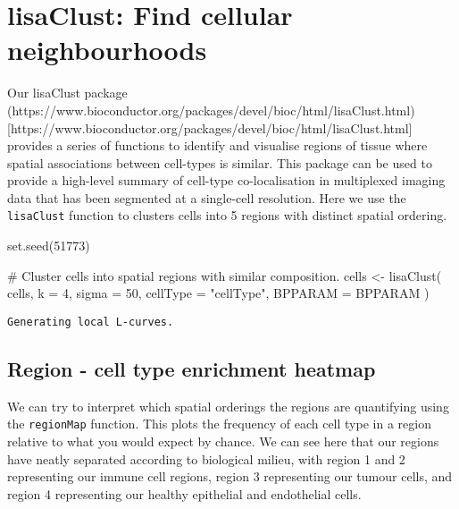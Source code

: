 \documentclass[
  letterpaper,
  DIV=11,
  numbers=noendperiod]{scrreprt}
\newenvironment{Shaded}{\begin{snugshade}}{\end{snugshade}}
\newcommand{\AttributeTok}[1]{\textcolor[rgb]{0.40,0.45,0.13}{#1}}
\newcommand{\CommentTok}[1]{\textcolor[rgb]{0.37,0.37,0.37}{#1}}
\newcommand{\DecValTok}[1]{\textcolor[rgb]{0.68,0.00,0.00}{#1}}
\newcommand{\FunctionTok}[1]{\textcolor[rgb]{0.28,0.35,0.67}{#1}}
\newcommand{\NormalTok}[1]{\textcolor[rgb]{0.00,0.23,0.31}{#1}}
\newcommand{\OtherTok}[1]{\textcolor[rgb]{0.00,0.23,0.31}{#1}}
\newcommand{\StringTok}[1]{\textcolor[rgb]{0.13,0.47,0.30}{#1}}
\begin{document}
\section{lisaClust: Find cellular
neighbourhoods}\label{lisaclust-find-cellular-neighbourhoods}

Our lisaClust package
(https://www.bioconductor.org/packages/devel/bioc/html/lisaClust.html){[}https://www.bioconductor.org/packages/devel/bioc/html/lisaClust.html{]}
provides a series of functions to identify and visualise regions of
tissue where spatial associations between cell-types is similar. This
package can be used to provide a high-level summary of cell-type
co-localisation in multiplexed imaging data that has been segmented at a
single-cell resolution. Here we use the \texttt{lisaClust} function to
clusters cells into 5 regions with distinct spatial ordering.

\begin{Shaded}
\begin{Highlighting}[]
\FunctionTok{set.seed}\NormalTok{(}\DecValTok{51773}\NormalTok{)}

\CommentTok{\# Cluster cells into spatial regions with similar composition.}
\NormalTok{cells }\OtherTok{\textless{}{-}} \FunctionTok{lisaClust}\NormalTok{(}
\NormalTok{  cells,}
  \AttributeTok{k =} \DecValTok{4}\NormalTok{,}
  \AttributeTok{sigma =} \DecValTok{50}\NormalTok{,}
  \AttributeTok{cellType =} \StringTok{"cellType"}\NormalTok{,}
  \AttributeTok{BPPARAM =}\NormalTok{ BPPARAM}
\NormalTok{)}
\end{Highlighting}
\end{Shaded}

\begin{verbatim}
Generating local L-curves.
\end{verbatim}

\subsection{Region - cell type enrichment
heatmap}\label{region---cell-type-enrichment-heatmap}

We can try to interpret which spatial orderings the regions are
quantifying using the \texttt{regionMap} function. This plots the
frequency of each cell type in a region relative to what you would
expect by chance. We can see here that our regions have neatly separated
according to biological milieu, with region 1 and 2 representing our
immune cell regions, region 3 representing our tumour cells, and region
4 representing our healthy epithelial and endothelial cells.
\end{document}
